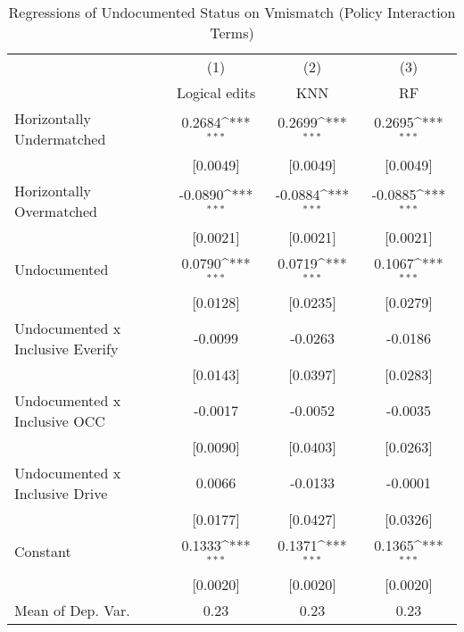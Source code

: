 \begin{table}[htbp]\centering
\def\sym#1{\ifmmode^{#1}\else\(^{#1}\)\fi}
\caption{Regressions of Undocumented Status on Vmismatch (Policy Interaction Terms)}
\begin{tabular}{l*{3}{c}}
\toprule
                    &\multicolumn{1}{c}{(1)}         &\multicolumn{1}{c}{(2)}         &\multicolumn{1}{c}{(3)}         \\
                    &Logical edits         &         KNN         &          RF         \\
\midrule
Horizontally Undermatched&      0.2684\sym{***}&      0.2699\sym{***}&      0.2695\sym{***}\\
                    &    [0.0049]         &    [0.0049]         &    [0.0049]         \\
\addlinespace
Horizontally Overmatched&     -0.0890\sym{***}&     -0.0884\sym{***}&     -0.0885\sym{***}\\
                    &    [0.0021]         &    [0.0021]         &    [0.0021]         \\
\addlinespace
Undocumented        &      0.0790\sym{***}&      0.0719\sym{***}&      0.1067\sym{***}\\
                    &    [0.0128]         &    [0.0235]         &    [0.0279]         \\
\addlinespace
Undocumented x Inclusive Everify&     -0.0099         &     -0.0263         &     -0.0186         \\
                    &    [0.0143]         &    [0.0397]         &    [0.0283]         \\
\addlinespace
Undocumented x Inclusive OCC&     -0.0017         &     -0.0052         &     -0.0035         \\
                    &    [0.0090]         &    [0.0403]         &    [0.0263]         \\
\addlinespace
Undocumented x Inclusive Drive&      0.0066         &     -0.0133         &     -0.0001         \\
                    &    [0.0177]         &    [0.0427]         &    [0.0326]         \\
\addlinespace
Constant            &      0.1333\sym{***}&      0.1371\sym{***}&      0.1365\sym{***}\\
                    &    [0.0020]         &    [0.0020]         &    [0.0020]         \\
\midrule
Mean of Dep. Var.   &        0.23         &        0.23         &        0.23         \\

\end{tabular}
\end{table}
